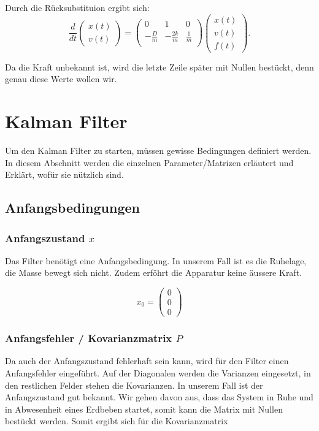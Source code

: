 Durch die Rücksubstituion ergibt sich:
\begin{equation}
\frac{d}{dt} \left(\begin{array}{c} x(t) \\ v(t) \end{array}\right) = \left(
 \begin{array}{ccc} 	
0 & 1& 0 \\ 
- \frac{D}{m} &-\frac{2k}{m} & \frac{1} {m}\\
\end{array}\right)  \left(\begin{array}{c} x(t)\\ v(t)\\ f(t) \end{array}\right).
\end{equation}


Da die Kraft unbekannt ist, wird die letzte Zeile später mit Nullen bestückt, denn genau diese Werte wollen wir. 

\section{Kalman Filter}
Um den Kalman Filter zu starten, müssen gewisse Bedingungen definiert werden. In diesem Abschnitt werden die einzelnen Parameter/Matrizen erläutert und Erklärt, wofür sie nützlich sind. 


\subsection{Anfangsbedingungen}
\subsubsection*{Anfangszustand $x$}
Das Filter benötigt eine Anfangsbedingung. In unserem Fall ist es die Ruhelage, die Masse bewegt sich nicht. Zudem erföhrt die Apparatur keine äussere Kraft.

\begin{equation}
{x_0 }= \left( \begin{array}{c} 0\\ 0\\ 0\end{array}\right)
\end{equation} 

\subsubsection*{Anfangsfehler / Kovarianzmatrix $P$}
Da auch der Anfangszustand fehlerhaft sein kann, wird für den Filter einen Anfangsfehler eingeführt. Auf der Diagonalen werden die Varianzen eingesetzt, in den restlichen Felder stehen die Kovarianzen.
In unserem Fall ist der Anfangszustand gut bekannt. Wir gehen davon aus, dass das System in Ruhe und in Abwesenheit eines Erdbeben startet, somit kann die Matrix mit Nullen bestückt werden. Somit ergibt sich für die Kovarianzmatrix

